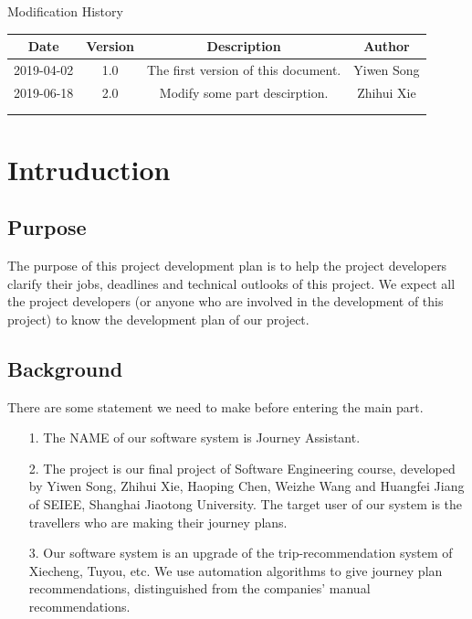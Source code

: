 \documentclass[10pt]{article}
\begin{document}
\newpage

\begin{center}
    {\LARGE Modification History}
    
    \begin{tabular}{|c|c|c|c|} 
        \hline 
        Date&Version&Description&Author\\
        \hline  
        2019-04-02&1.0&The first version of this document.&Yiwen Song\\
		\hline 
        2019-06-18&2.0&Modify some part descirption.&Zhihui Xie\\

		\hline
		& & & \\
		\hline
		& & & \\
		\hline
    \end{tabular}    
\end{center}

\newpage

\tableofcontents
\newpage

\section{Intruduction}
\subsection{Purpose}
The purpose of this project development plan is to help the project developers clarify their jobs, deadlines and technical outlooks of this project. We expect all the project developers (or anyone who are involved in the development of this project) to know the development plan of our project.

\subsection{Background}
There are some statement we need to make before entering the main part.

\begin{itemize}
	\item[1.] The NAME of our software system is Journey Assistant.
	\item[2.] The project is our final project of Software Engineering course, developed by Yiwen Song, Zhihui Xie, Haoping Chen, Weizhe Wang and Huangfei Jiang of SEIEE, Shanghai Jiaotong University. The target user of our system is the travellers who are making their journey plans. 
	\item[3.] Our software system is an upgrade of the trip-recommendation system of Xiecheng, Tuyou, etc. We use automation algorithms to give journey plan recommendations, distinguished from the companies' manual recommendations.
\end{itemize}
\end{document}
